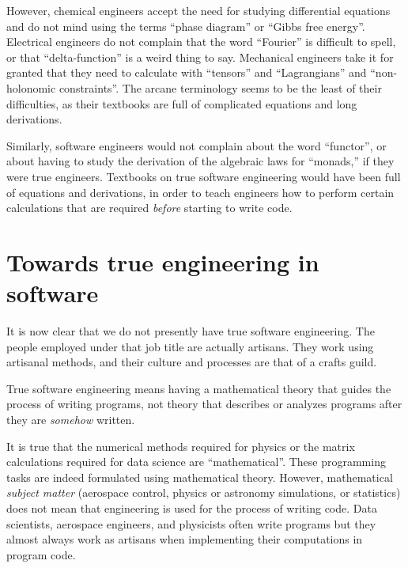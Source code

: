 However, chemical engineers accept the need for studying differential
equations and do not mind using the terms \textsf{``}phase diagram\textsf{''} or \textsf{``}Gibbs
free energy\textsf{''}. Electrical engineers do not complain that the word
\textsf{``}Fourier\textsf{''} is difficult to spell, or that \textsf{``}delta-function\textsf{''}
is a weird thing to say. Mechanical engineers take it for granted
that they need to calculate with \textsf{``}tensors\textsf{''} and \textsf{``}Lagrangians\textsf{''}
and \textsf{``}non-holonomic constraints\textsf{''}. The arcane terminology seems
to be the least of their difficulties, as their textbooks are full
of complicated equations and long derivations.

Similarly, software engineers would not complain about the word \textsf{``}functor\textsf{''},
or about having to study the derivation of the algebraic laws for
\textsf{``}monads,\textsf{''} \textemdash{} if they were true engineers. Textbooks
on true software engineering would have been full of equations and
derivations, in order to teach engineers how to perform certain calculations
that are required \emph{before} starting to write code.

\section{Towards true engineering in software}

It is now clear that we do not presently have true software engineering.
The people employed under that job title are actually artisans. They
work using artisanal methods, and their culture and processes are
that of a crafts guild.

True software engineering means having a mathematical theory that
guides the process of writing programs, \textemdash{} not theory that
describes or analyzes programs after they are \emph{somehow} written.

It is true that the numerical methods required for physics or the
matrix calculations required for data science are \textsf{``}mathematical\textsf{''}.
These programming tasks are indeed formulated using mathematical theory.
However, mathematical \emph{subject matter} (aerospace control, physics
or astronomy simulations, or statistics) does not mean that engineering
is used for the process of writing code. Data scientists, aerospace
engineers, and physicists often write programs \textemdash{} but they
almost always work as artisans when implementing their computations
in program code.

